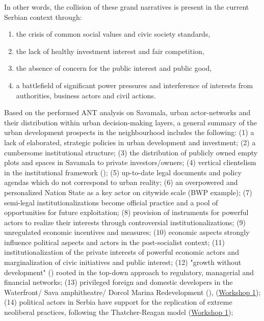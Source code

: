 \documentclass[11pt]{report}
\begin{document}
{{{{In other words, the collision of these grand narratives is present in the current Serbian context through:
\begin{enumerate}
\item  the crisis of common social values and civic society standards, 
\item the lack of healthy investment interest and fair competition, 
\item the absence of concern for the public interest and public good,
\item a battlefield of significant power pressures and interference of interests from authorities, business actors and civil actions.
\end{enumerate}

Based on the performed ANT analysis on Savamala, urban actor-networks and their distribution within urban decision-making layers, a general summary of the urban development prospects in the neighbourhood includes the following: 
(1) a lack of elaborated, strategic policies in urban development and investment;
(2) a cumbersome institutional structure;
(3) the distribution of publicly owned empty plots and spaces in Savamala to private investors/owners;
(4) vertical clientelism in the institutional framework (\href{Vujovic}{\citealt{vujovic_belgrades_2007}});
(5) up-to-date legal documents and policy agendas which do not correspond to urban reality;
(6) an overpowered and personalized Nation State as a key actor on citywide scale (BWP example);
(7) semi-legal institutionalizations become official practice and a pool of opportunities for future exploitation;
(8) provision of instruments for powerful actors to realize their interests through controversial institutionalizations;
(9) unregulated economic incentives and measures;
(10) economic aspects strongly influence political aspects and actors in the post-socialist context;
(11) institutionalization of the private interests of powerful economic actors and marginalization of civic initiatives and public interest;
(12) "growth without development" (\cite{Vujosevic and Maricic, 2012}) rooted in the top-down approach to regulatory, managerial and financial networks;
(13) privileged foreign and domestic developers in the Waterfront/ Sava amphitheatre/ Dorcol Marina Redevelopment (\href{Djordjevic}{\citealt{djordjevic_system_2009}}), (\href{Expert Workshop}{Workshop 1});
(14) political actors in Serbia have support for the replication of extreme neoliberal practices, following the Thatcher-Reagan model  (\href{Expert Workshop}{Workshop 1});
}}}}
\end{document}
